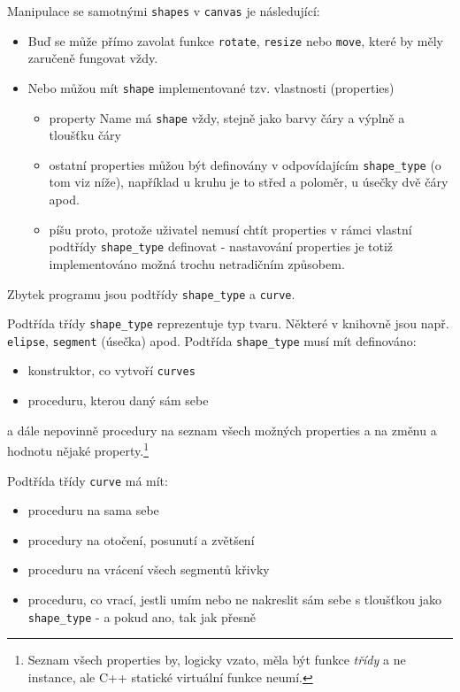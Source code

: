 \documentclass[11pt]{article} %
\begin{document}
Manipulace se samotnými \texttt{shapes} v \texttt{canvas} je následující:
\begin{itemize}
    \item Buď se může přímo zavolat funkce \texttt{rotate}, \texttt{resize} nebo \texttt{move}, které by měly zaručeně fungovat vždy.
    \item Nebo můžou mít \texttt{shape} implementované tzv. vlastnosti (properties)
    \begin{itemize}
        \item property Name má \texttt{shape} vždy, stejně jako barvy čáry a výplně a tloušťku čáry
        \item ostatní properties můžou být definovány v odpovídajícím \texttt{shape\_type} (o tom viz níže), například u kruhu je to střed a poloměr, u úsečky dvě čáry apod.
        \item {} píšu proto, protože uživatel nemusí chtít properties v rámci vlastní podtřídy \texttt{shape\_type} definovat - nastavování properties je totiž implementováno možná trochu netradičním způsobem.
    \end{itemize}
\end{itemize}
    
Zbytek programu jsou podtřídy \texttt{shape\_type} a \texttt{curve}.

Podtřída třídy \texttt{shape\_type} reprezentuje typ tvaru. Některé v knihovně jsou např. \texttt{elipse}, \texttt{segment} (úsečka) apod. Podtřída \texttt{shape\_type} musí mít definováno:
\begin{itemize}
    \item konstruktor, co vytvoří \texttt{curves}
    \item proceduru, kterou daný  sám sebe
\end{itemize}
a dále nepovinně procedury na seznam všech možných properties a na změnu a hodnotu nějaké property.\footnote{Seznam všech properties by, logicky vzato, měla být funkce \emph{třídy} a ne instance, ale C++ statické virtuální funkce neumí.}

Podtřída třídy \texttt{curve} má mít:
\begin{itemize}
    \item proceduru na  sama sebe
    \item procedury na otočení, posunutí a zvětšení
    \item proceduru na vrácení všech segmentů křivky 
    \item proceduru, co vrací, jestli umím nebo ne nakreslit sám sebe s tloušťkou jako \texttt{shape\_type} - a pokud ano, tak jak přesně
\end{itemize}
\end{document}
